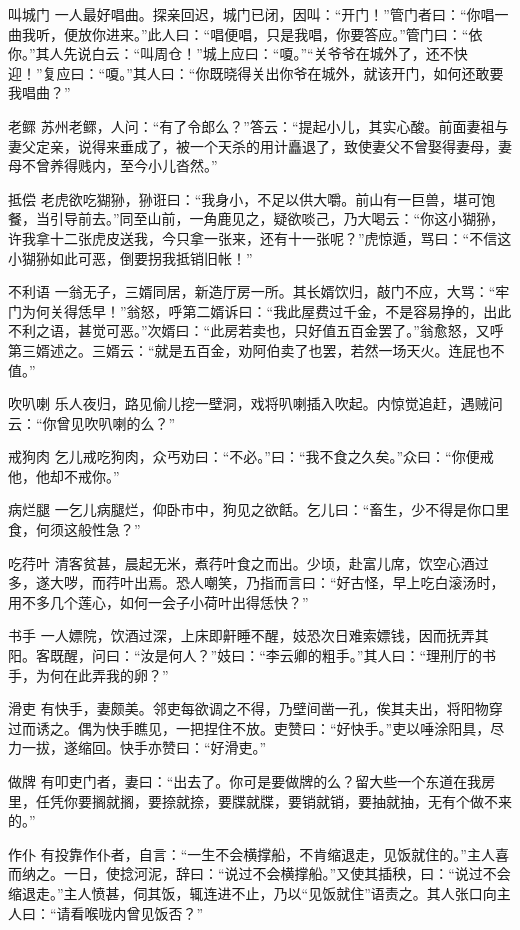 \documentclass[12pt,UTF8]{ctexbook}
\begin{document}
叫城门
一人最好唱曲。探亲回迟，城门已闭，因叫：“开门！”管门者曰：“你唱一曲我听，便放你进来。”此人曰：“唱便唱，只是我唱，你要答应。”管门曰：“依你。”其人先说白云：“叫周仓！”城上应曰：“嗄。”“关爷爷在城外了，还不快迎！”复应曰：“嗄。”其人曰：“你既晓得关出你爷在城外，就该开门，如何还敢要我唱曲？”

老鳏
苏州老鳏，人问：“有了令郎么？”答云：“提起小儿，其实心酸。前面妻祖与妻父定亲，说得来垂成了，被一个天杀的用计矗退了，致使妻父不曾娶得妻母，妻母不曾养得贱内，至今小儿沓然。”

抵偿
老虎欲吃猢狲，狲诳曰：“我身小，不足以供大嚼。前山有一巨兽，堪可饱餐，当引导前去。”同至山前，一角鹿见之，疑欲啖己，乃大喝云：“你这小猢狲，许我拿十二张虎皮送我，今只拿一张来，还有十一张呢？”虎惊遁，骂曰：“不信这小猢狲如此可恶，倒要拐我抵销旧帐！”

不利语
一翁无子，三婿同居，新造厅房一所。其长婿饮归，敲门不应，大骂：“牢门为何关得恁早！”翁怒，呼第二婿诉曰：“我此屋费过千金，不是容易挣的，出此不利之语，甚觉可恶。”次婿曰：“此房若卖也，只好值五百金罢了。”翁愈怒，又呼第三婿述之。三婿云：“就是五百金，劝阿伯卖了也罢，若然一场天火。连屁也不值。”

吹叭喇
乐人夜归，路见偷儿挖一壁洞，戏将叭喇插入吹起。内惊觉追赶，遇贼问云：“你曾见吹叭喇的么？”

戒狗肉
乞儿戒吃狗肉，众丐劝曰：“不必。”曰：“我不食之久矣。”众曰：“你便戒他，他却不戒你。”

病烂腿
一乞儿病腿烂，仰卧市中，狗见之欲餂。乞儿曰：“畜生，少不得是你口里食，何须这般性急？”

吃荇叶
清客贫甚，晨起无米，煮荇叶食之而出。少顷，赴富儿席，饮空心酒过多，遂大哕，而荇叶出焉。恐人嘲笑，乃指而言曰：“好古怪，早上吃白滚汤时，用不多几个莲心，如何一会子小荷叶出得恁快？”

书手
一人嫖院，饮酒过深，上床即鼾睡不醒，妓恐次日难索嫖钱，因而抚弄其阳。客既醒，问曰：“汝是何人？”妓曰：“李云卿的粗手。”其人曰：“理刑厅的书手，为何在此弄我的卵？”

滑吏
有快手，妻颇美。邻吏每欲调之不得，乃壁间凿一孔，俟其夫出，将阳物穿过而诱之。偶为快手瞧见，一把捏住不放。吏赞曰：“好快手。”吏以唾涂阳具，尽力一拔，遂缩回。快手亦赞曰：“好滑吏。”

做牌
有叩吏门者，妻曰：“出去了。你可是要做牌的么？留大些一个东道在我房里，任凭你要搁就搁，要捺就捺，要牒就牒，要销就销，要抽就抽，无有个做不来的。”

作仆
有投靠作仆者，自言：“一生不会横撑船，不肯缩退走，见饭就住的。”主人喜而纳之。一日，使捻河泥，辞曰：“说过不会横撑船。”又使其插秧，曰：“说过不会缩退走。”主人愤甚，伺其饭，辄连进不止，乃以“见饭就住”语责之。其人张口向主人曰：“请看喉咙内曾见饭否？”
\end{document}

